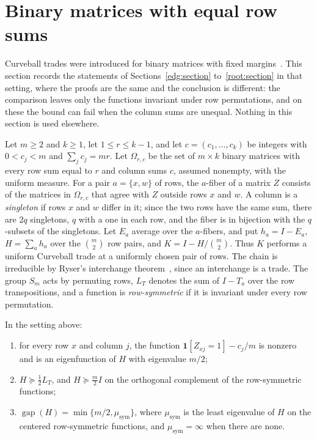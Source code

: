 \section{Binary matrices with equal row sums}\label{bin:section}
Curveball trades were introduced for binary matrices with fixed
margins~\cite{SNBFS14}. This section records the statements of
Sections~\ref{edg:section} to~\ref{root:section} in that setting, where the
proofs are the same and the conclusion is different: the comparison leaves
only the functions invariant under row permutations, and on these the bound
can fail when the column sums are unequal. Nothing in this section is used
elsewhere.

Let $m\ge2$ and $k\ge1$, let $1\le r\le k-1$, and let
$c=(c_1,\ldots,c_k)$ be integers with $0<c_j<m$ and $\sum_jc_j=mr$. Let
$\Omega_{r,c}$ be the set of $m\times k$ binary matrices with every row sum
equal to $r$ and column sums $c$, assumed nonempty, with the uniform
measure. For a pair $a=\{x,w\}$ of rows, the $a$-fiber of a matrix $Z$
consists of the matrices in $\Omega_{r,c}$ that agree with $Z$ outside rows
$x$ and $w$. A column is a \emph{singleton} if rows $x$ and $w$ differ in it;
since the two rows have the same sum, there are $2q$ singletons, $q$ with a
one in each row, and the fiber is in bijection with the $q$-subsets of the
singletons. Let $E_a$ average over the $a$-fibers, and put $h_a=I-E_a$,
$H=\sum_ah_a$ over the $\binom m2$ row pairs, and $K=I-H/\binom m2$. Thus
$K$ performs a uniform Curveball trade at a uniformly chosen pair of rows.
The chain is irreducible by Ryser's interchange
theorem~\cite[Theorem~3.1]{Ryser57}, since an interchange is a trade. The
group $S_m$ acts by permuting rows, $L_T$ denotes the sum of $I-T_a$ over the
row transpositions, and a function is \emph{row-symmetric} if it is invariant
under every row permutation.

\begin{proposition}\label{bin:main}
In the setting above:
\begin{enumerate}
\item for every row $x$ and column $j$, the function $\mathbf1[Z_{xj}=1]-c_j/m$
is nonzero and is an eigenfunction of $H$ with eigenvalue $m/2$;
\item $H\succeq\tfrac12L_T$, and $H\succeq\tfrac m2I$ on the orthogonal
complement of the row-symmetric functions;
\item $\operatorname{gap}(H)=\min\{m/2,\mu_{\mathrm{sym}}\}$, where
$\mu_{\mathrm{sym}}$ is the least eigenvalue of $H$ on the centered
row-symmetric functions, and $\mu_{\mathrm{sym}}=\infty$ when there are none.
\end{enumerate}
\end{proposition}

